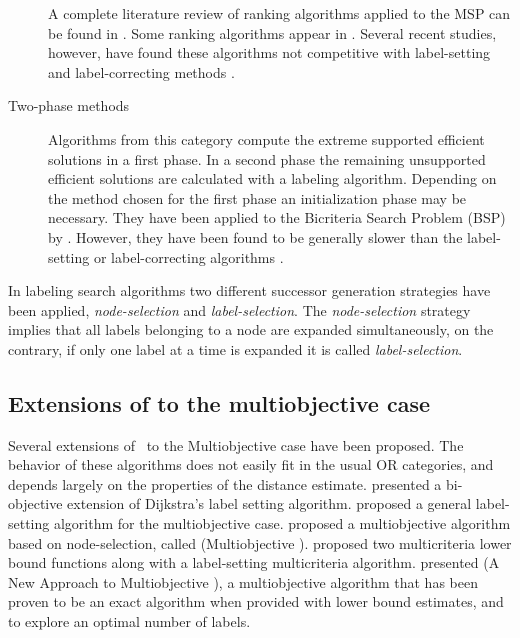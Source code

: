\begin{description}
    A complete literature review of ranking algorithms applied to the MSP can be found in \citep{martinsetal2007,climacopascoal2012}. Some ranking algorithms appear in \citep{martins1984c,azevedomartins1991,martinsetal2007,paixaosantos2008}. Several recent studies, however, have found  these algorithms not competitive with label-setting and label-correcting methods \citep{huarngetal1996,skriverandersen2000,Raith2009}.
    
    \item[Two-phase methods] Algorithms from this category compute the extreme supported efficient solutions in a first phase. In a second phase the remaining unsupported efficient solutions are calculated with a labeling algorithm. Depending on the method chosen for the first phase an initialization phase may be necessary. They have been applied to the Bicriteria Search Problem (BSP) by \citet{Mote1991,Raith2009a,Raith2009}. However, they have been found to be generally slower than the label-setting or label-correcting algorithms \citep{Raith2009a,Raith2009}.
    
\end{description}

In labeling search algorithms two different successor generation strategies have been applied, \textit{node-selection} and \textit{label-selection}. The \textit{node-selection} strategy implies that all labels belonging to a node are expanded simultaneously, on the contrary, if only one label at a time is expanded it is called \textit{label-selection}. 

\subsection{Extensions of \texorpdfstring{\astar}{A*} to the multiobjective case}
\label{chapMultiObjAlg:subsec:label-setting}

Several extensions of \astar \ to the Multiobjective case have been proposed. The behavior of these algorithms does not easily fit in the usual OR categories, and depends largely on the properties of the distance estimate. \citet{hansen1979} presented a bi-objective extension of Dijkstra's label setting algorithm. \citet{Martins1984} proposed a general label-setting algorithm for the multiobjective case. \citet{stewartwhite1991} proposed a multiobjective algorithm based on node-selection, called \moa (Multiobjective \astar). \citet{Tung1992} proposed two multicriteria lower bound functions along with a label-setting multicriteria algorithm. \citet{Mandow2010} presented \namoa (A New Approach to Multiobjective \astar), a multiobjective algorithm that has been proven to be an exact algorithm when provided with lower bound estimates, and to explore an optimal number of labels.

